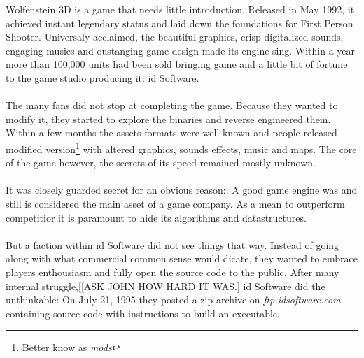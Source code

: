 Wolfenstein 3D is a game that needs little introduction. Released in May 1992, it achieved instant legendary status and laid down the foundations for First Person Shooter. Universaly acclaimed, the beautiful graphics, crisp digitalized sounds, engaging musics and oustanging game design made its engine sing. Within a year more than 100,000 units had been sold bringing game and a little bit of fortune to the game studio producing it: id Software.\\
\\
The many fans did not stop at completing the game. Because they wanted to modify it, they started to explore the binaries and reverse engineered them. Within a few months the assets formats were well known and people released modified version\footnote{Better know as \emph{mods}} with altered graphics, sounds effects, music and maps. The core of the game however, the secrets of its speed remained mostly unknown.\\
\\
It was closely guarded secret for an obvious reason:. A good game engine was and still is considered the main asset of a game company. As a mean to outperform competitior it is paramount to hide its algorithms and datastructures.\\
\\
But a faction within id Software did not see things that way. Instead of going along with what commercial common sense would dicate, they wanted to embrace players enthousiasm and fully open the source code to the public. After many internal struggle,[[ASK JOHN HOW HARD IT WAS.] id Software did the unthinkable: On July 21, 1995 they posted a zip archive on \emph{ftp.idsoftware.com} containing source code with instructions to build an executable.\\

